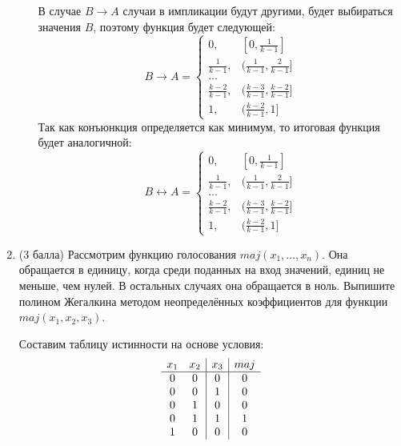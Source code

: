 \begin{enumerate}
\begin{enumerate}
\begin{solution}
      В случае $B\rightarrow A$ случаи в импликации будут другими, будет выбираться значения $B$, поэтому функция будет следующей:
      \begin{equation}
        B\rightarrow A =
        \begin{cases}
          0, & [0, \frac{1}{k-1}] \\
          \frac{1}{k-1}, & (\frac{1}{k-1}, \frac{2}{k-1}] \\
          \dots \\
          \frac{k-2}{k-1}, & (\frac{k-3}{k-1}, \frac{k-2}{k-1}] \\
          1, & (\frac{k-2}{k-1}, 1]
        \end{cases}
      \end{equation}
      Так как конъюнкция определяется как минимум, то итоговая функция будет аналогичной:
      \begin{equation}
        B\leftrightarrow A =
        \begin{cases}
          0, & [0, \frac{1}{k-1}] \\
          \frac{1}{k-1}, & (\frac{1}{k-1}, \frac{2}{k-1}] \\
          \dots \\
          \frac{k-2}{k-1}, & (\frac{k-3}{k-1}, \frac{k-2}{k-1}] \\
          1, & (\frac{k-2}{k-1}, 1]
        \end{cases}
      \end{equation}
    \end{solution}
  \end{enumerate}
  \item (3 балла) Рассмотрим функцию голосования $maj(x_1, ..., x_n)$. Она обращается в единицу, когда среди поданных на вход значений, единиц не меньше, чем нулей. В остальных случаях она обращается в ноль. Выпишите полином Жегалкина методом неопределённых коэффициентов для функции $maj(x_1, x_2, x_3)$.
  \begin{solution}
    Составим таблицу истинности на основе условия:
    \begin{displaymath}
      \begin{array}{c c|c|c}
        x_1 & x_2 & x_3 & maj\\
        \hline
        0 & 0 & 0 & 0\\
        0 & 0 & 1 & 0\\
        0 & 1 & 0 & 0\\
        0 & 1 & 1 & 1\\
        1 & 0 & 0 & 0\\

\end{array}
\end{displaymath}
\end{solution}
\end{enumerate}
